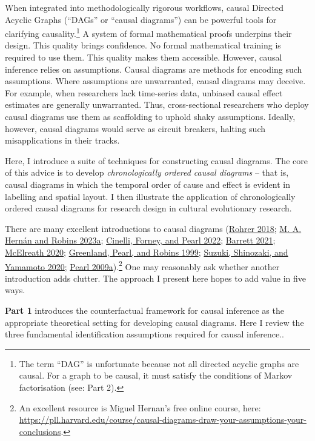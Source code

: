 \documentclass[
  singlecolumn]{article}
\begin{document}
When integrated into methodologically rigorous workflows, causal
Directed Acyclic Graphs (``DAGs'' or ``causal diagrams'') can be
powerful tools for clarifying causality.\footnote{The term ``DAG'' is
  unfortunate because not all directed acyclic graphs are causal. For a
  graph to be causal, it must satisfy the conditions of Markov
  factorisation (see: Part 2).} A system of formal mathematical proofs
underpins their design. This quality brings confidence. No formal
mathematical training is required to use them. This quality makes them
accessible. However, causal inference relies on assumptions. Causal
diagrams are methods for encoding such assumptions. Where assumptions
are unwarranted, causal diagrams may deceive. For example, when
researchers lack time-series data, unbiased causal effect estimates are
generally unwarranted. Thus, cross-sectional researchers who deploy
causal diagrams use them as scaffolding to uphold shaky assumptions.
Ideally, however, causal diagrams would serve as circuit breakers,
halting such misapplications in their tracks.

Here, I introduce a suite of techniques for constructing causal
diagrams. The core of this advice is to develop \emph{chronologically
ordered causal diagrams} -- that is, causal diagrams in which the
temporal order of cause and effect is evident in labelling and spatial
layout. I then illustrate the application of chronologically ordered
causal diagrams for research design in cultural evolutionary research.

There are many excellent introductions to causal diagrams
(\protect\hyperlink{ref-rohrer2018}{Rohrer 2018};
\protect\hyperlink{ref-hernuxe1n2023}{M. A. Hernán and Robins 2023a};
\protect\hyperlink{ref-cinelli2022}{Cinelli, Forney, and Pearl 2022};
\protect\hyperlink{ref-barrett2021}{Barrett 2021};
\protect\hyperlink{ref-mcelreath2020}{McElreath 2020};
\protect\hyperlink{ref-greenland1999}{Greenland, Pearl, and Robins
1999}; \protect\hyperlink{ref-suzuki2020}{Suzuki, Shinozaki, and
Yamamoto 2020}; \protect\hyperlink{ref-pearl2009}{Pearl
2009a}).\footnote{An excellent resource is Miguel Hernan's free online
  course, here:
  \url{https://pll.harvard.edu/course/causal-diagrams-draw-your-assumptions-your-conclusions}.}
One may reasonably ask whether another introduction adds clutter. The
approach I present here hopes to add value in five ways.

\textbf{Part 1} introduces the counterfactual framework for causal
inference as the appropriate theoretical setting for developing causal
diagrams. Here I review the three fundamental identification assumptions
required for causal inference..
\end{document}
